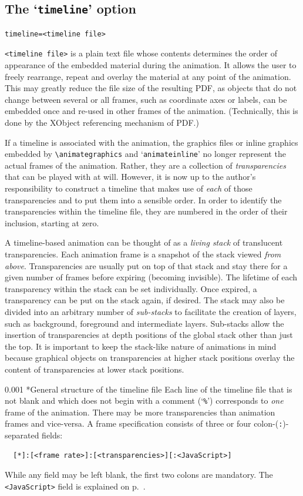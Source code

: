 \documentclass[a4paper]{article}
\makeatletter
\newcommand\myparagraph{\@startsection{paragraph}{3}{\z@}%
                                     {\parskip}%
                                     {0.001\parskip}%
                                     {\itshape\normalsize}}
\makeatother
\begin{document}
\subsection{The `{\tt timeline}' option}\label{sect:timeline}
\begin{verbatim}
timeline=<timeline file>
\end{verbatim}
\verb+<timeline file>+ is a plain text file whose contents determines the order of appearance of the embedded material during the animation. It allows the user to freely rearrange, repeat and overlay the material at any point of the animation. This may greatly reduce the file size of the resulting PDF, as objects that do not change between several or all frames, such as coordinate axes or labels, can be embedded once and re-used in other frames of the animation. (Technically, this is done by the XObject referencing mechanism of PDF.)

If a timeline is associated with the animation, the graphics files or inline graphics embedded by \verb+\animategraphics+ and `\verb+animateinline+' no longer represent the actual frames of the animation. Rather, they are a collection of \emph{transparencies} that can be played with at will. However, it is now up to the author's responsibility to construct a timeline that makes use of \emph{each} of those transparencies and to put them into a sensible order. In order to identify the transparencies within the timeline file, they are numbered in the order of their inclusion, starting at zero.

A timeline-based animation can be thought of as a \emph{living stack} of translucent transparencies. Each animation frame is a snapshot of the stack viewed \emph{from above}. Transparencies are usually put on top of that stack and stay there for a given number of frames before expiring (becoming invisible). The lifetime of each transparency within the stack can be set individually. Once expired, a transparency can be put on the stack again, if desired. The stack may also be divided into an arbitrary number of \emph{sub-stacks} to facilitate the creation of layers, such as background, foreground and intermediate layers. Sub-stacks allow the insertion of transparencies at depth positions of the global stack other than just the top. It is important to keep the stack-like nature of animations in mind because graphical objects on transparencies at higher stack positions overlay the content of transparencies at lower stack positions.

\myparagraph*{General structure of the timeline file}
Each line of the timeline file that is not blank and which does not begin with a comment (`\verb+%+') corresponds to \emph{one} frame of the animation. There may be more transparencies than animation frames and vice-versa. A frame specification consists of three or four colon-(\verb+:+)-separated fields:
\begin{verbatim}
  [*]:[<frame rate>]:[<transparencies>][:<JavaScript>]
\end{verbatim}
While any field may be left blank, the first two colons are mandatory. The \verb+<JavaScript>+ field is explained on p.~\pageref{sect:jsfield}.
\end{document}
